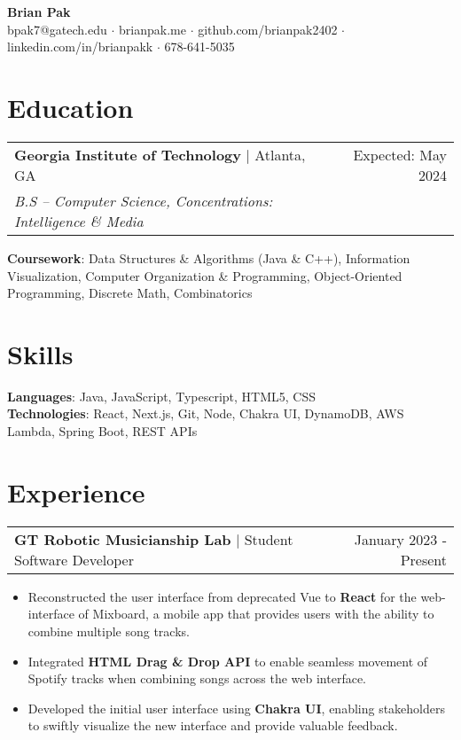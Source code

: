 \documentclass[letterpaper,11pt]{article}
\makeatletter
\newcommand{\resumeEducationHeading}[5]{
    \begin{tabular*}{0.99\textwidth}[t]{l@{\extracolsep{\fill}}r}
      \textbf{#1} $\vert$ #2 & #3 \\
      \textit{\small#4} & \textit{\small #5} \\
    \end{tabular*}\vspace{0.5pt}
}
\newcommand{\resumeExperienceHeading}[3]{
    \begin{tabular*}{0.99\textwidth}[t]{l@{\extracolsep{\fill}}r}
      \textbf{#1} $\vert$ {#2} & {#3} \\
    \end{tabular*}\vspace{-3pt}
}
\newcommand{\resumeItemListStart}{\begin{itemize}[noitemsep]\vspace{-4pt}}
\newcommand{\resumeItemListEnd}{\end{itemize}}
\makeatother
\begin{document}
\begin{center}
  \textbf{\huge Brian Pak} \\
  \vspace*{0.1cm}
  {bpak7@gatech.edu} $\cdot$ {brianpak.me} $\cdot$ {github.com/brianpak2402} $\cdot$ {linkedin.com/in/brianpakk}  $\cdot$ 678-641-5035 
\end{center}

\section{Education}
    \resumeEducationHeading
      {Georgia Institute of Technology}{Atlanta, GA}{Expected: May 2024}
      {B.S -- Computer Science, Concentrations: Intelligence \& Media}{\vspace{0.1cm} } %
    \textbf{Coursework}{: Data Structures \& Algorithms (Java \& C++), Information Visualization, Computer Organization \& Programming, Object-Oriented Programming, Discrete Math, Combinatorics} \\

\section{Skills}
    \textbf{Languages}{: Java, JavaScript, Typescript, HTML5, CSS } \\
    \textbf{Technologies}{: React, Next.js, Git, Node, Chakra UI, DynamoDB, AWS Lambda, Spring Boot, REST APIs}

\section{Experience}
  \resumeExperienceHeading{GT Robotic Musicianship Lab}{Student Software Developer}{January 2023 - Present}
    \resumeItemListStart
      \item {Reconstructed the user interface from deprecated Vue to \textbf{React} for the web-interface of Mixboard, a mobile app that provides users with the ability to combine multiple song tracks.}
      \item {Integrated \textbf{HTML Drag \& Drop API} to enable seamless movement of Spotify tracks when combining songs across the web interface.}
      \item {Developed the initial user interface using \textbf{Chakra UI}, enabling stakeholders to swiftly visualize the new interface and provide valuable feedback.}
    \resumeItemListEnd
  
\end{document}
